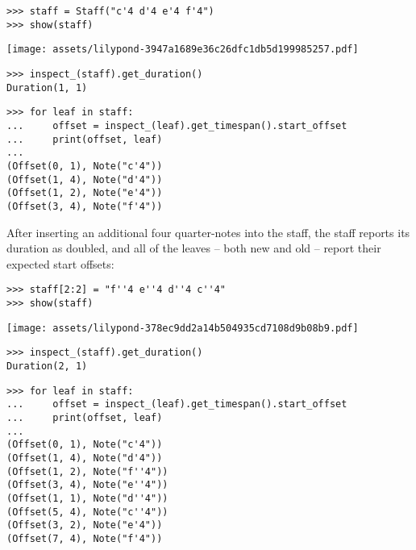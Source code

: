 \begin{abjadbookoutput}
\begin{singlespacing}
\vspace{-0.5\baselineskip}
\begin{verbatim}
>>> staff = Staff("c'4 d'4 e'4 f'4")
>>> show(staff)
\end{verbatim}
\noindent\texttt{[image: assets/lilypond-3947a1689e36c26dfc1db5d199985257.pdf]}
\begin{verbatim}
>>> inspect_(staff).get_duration()
Duration(1, 1)
\end{verbatim}
\begin{verbatim}
>>> for leaf in staff:
...     offset = inspect_(leaf).get_timespan().start_offset
...     print(offset, leaf)
...
(Offset(0, 1), Note("c'4"))
(Offset(1, 4), Note("d'4"))
(Offset(1, 2), Note("e'4"))
(Offset(3, 4), Note("f'4"))
\end{verbatim}
\end{singlespacing}
\end{abjadbookoutput}

\noindent After inserting an additional four quarter-notes into the staff, the
staff reports its duration as doubled, and all of the leaves -- both new and
old -- report their expected start offsets:

\begin{comment}
<abjad>
staff[2:2] = "f''4 e''4 d''4 c''4"
show(staff)
inspect_(staff).get_duration()
for leaf in staff:
    offset = inspect_(leaf).get_timespan().start_offset
    print(offset, leaf)

</abjad>
\end{comment}

\begin{abjadbookoutput}
\begin{singlespacing}
\vspace{-0.5\baselineskip}
\begin{verbatim}
>>> staff[2:2] = "f''4 e''4 d''4 c''4"
>>> show(staff)
\end{verbatim}
\noindent\texttt{[image: assets/lilypond-378ec9dd2a14b504935cd7108d9b08b9.pdf]}
\begin{verbatim}
>>> inspect_(staff).get_duration()
Duration(2, 1)
\end{verbatim}
\begin{verbatim}
>>> for leaf in staff:
...     offset = inspect_(leaf).get_timespan().start_offset
...     print(offset, leaf)
...
(Offset(0, 1), Note("c'4"))
(Offset(1, 4), Note("d'4"))
(Offset(1, 2), Note("f''4"))
(Offset(3, 4), Note("e''4"))
(Offset(1, 1), Note("d''4"))
(Offset(5, 4), Note("c''4"))
(Offset(3, 2), Note("e'4"))
(Offset(7, 4), Note("f'4"))
\end{verbatim}
\end{singlespacing}
\end{abjadbookoutput}

